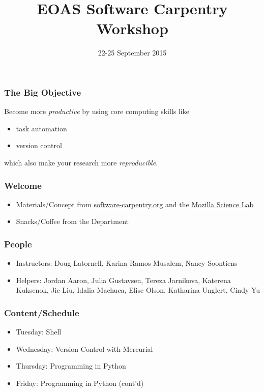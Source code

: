 \documentclass{beamer}
\title[]{EOAS Software Carpentry Workshop}
\subtitle[]{}
\date[]{22-25 September 2015}
\begin{document}




\begin{frame}[plain]
  \titlepage
\end{frame}


\begin{frame}
  \frametitle{The Big Objective}
  Become more {\em productive} by using core computing skills like
  \begin{itemize}
    \item task automation
    \item version control
  \end{itemize}
  which also make your research more {\em reproducible}.
\end{frame}


\begin{frame}
  \frametitle{Welcome}
  \begin{itemize}
    \item Materials/Concept from \href{http://software-carpentry.org/}{software-carpentry.org} and the \href{https://wiki.mozilla.org/ScienceLab}{Mozilla Science Lab}
    \item Snacks/Coffee from the Department
  \end{itemize}
\end{frame}


\begin{frame}
  \frametitle{People}
  \begin{itemize}
    \item Instructors: Doug Latornell, Karina Ramos Musalem, Nancy Soontiens
    \item Helpers: Jordan Aaron, Julia Gustavsen, Tereza Jarnikova, Katerena Kuksenok, Jie Liu, Idalia Machuca, Elise Olson, Katharina Unglert, Cindy Yu
  \end{itemize}
\end{frame}


\begin{frame}
  \frametitle{Content/Schedule}
  \begin{itemize}
    \item Tuesday: Shell
    \item Wednesday: Version Control with Mercurial
    \item Thursday: Programming in Python
    \item Friday: Programming in Python (cont'd)
  \end{itemize}
\end{frame}
\end{document}

